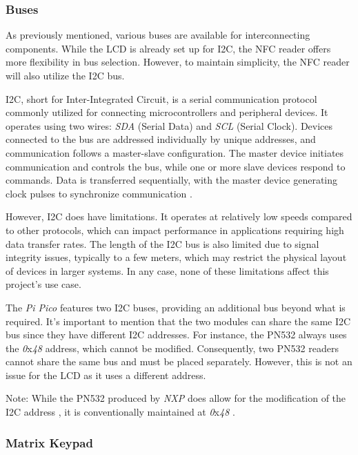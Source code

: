 \subsubsection*{Buses}

As previously mentioned, various buses are available for interconnecting components. While the LCD is already set up 
for I2C, the NFC reader offers more flexibility in bus selection. However, to maintain simplicity, the NFC reader will 
also utilize the I2C bus.

I2C, short for Inter-Integrated Circuit, is a serial communication protocol commonly utilized for connecting 
microcontrollers and peripheral devices. It operates using two wires: \textit{SDA} (Serial Data) and \textit{SCL} (Serial 
Clock). Devices connected to the bus are addressed individually by unique addresses, and communication follows a 
master-slave configuration. The master device initiates communication and controls the bus, while one or more slave devices 
respond to commands. Data is transferred sequentially, with the master device generating clock pulses to synchronize 
communication \cite{nxpi2c}.

However, I2C does have limitations. It operates at relatively low speeds compared to other protocols, which can impact 
performance in applications requiring high data transfer rates. The length of the I2C bus is also limited due to signal 
integrity issues, typically to a few meters, which may restrict the physical layout of devices in larger systems. In any 
case, none of these limitations affect this project's use case.

The \textit{Pi Pico} features two I2C buses, providing an additional bus beyond what is required. It's important to mention 
that the two modules can share the same I2C bus since they have different I2C addresses. For instance, the PN532 always uses 
the \textit{0}x\textit{48} address, which cannot be modified. Consequently, two PN532 readers cannot share the same bus and 
must be placed separately. However, this is not an issue for the LCD as it uses a different address.

Note: While the PN532 produced by \textit{NXP} does allow for the modification of the I2C address \cite{nxp_pn532}, it is 
conventionally maintained at \textit{0}x\textit{48} \cite{i2cdevices_pn532}.


\subsubsection*{Matrix Keypad}


